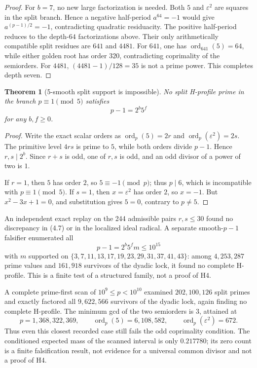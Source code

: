 \documentclass[11pt]{amsart}
\newtheorem{theorem}{Theorem}[section]
\theoremstyle{definition}
\theoremstyle{remark}
\newcommand{\eps}{\varepsilon}
\newcommand{\ord}{\operatorname{ord}}
\begin{document}
\begin{proof}
For \(b=7\), no new large factorization is needed.  Both \(5\) and
\(\eps^2\) are squares in the split branch.  Hence a negative
half-period \(a^{64}=-1\) would give
\(a^{(p-1)/2}=-1\), contradicting quadratic residuacity.  The positive
half-period reduces to the depth-\(64\) factorizations above.  Their
only arithmetically compatible split residues are \(641\) and \(4481\).
For \(641\), one has \(\ord_{641}(5)=64\), while either golden root has
order \(320\), contradicting coprimality of the semiorders.  For \(4481\),
\((4481-1)/128=35\) is not a prime power.  This completes depth seven.
\end{proof}

\begin{theorem}[5-smooth split support is impossible]
\label{thm:Hfivesmooth}
No split H-profile prime in the branch \(p\equiv1\pmod5\) satisfies
\[
p-1=2^b5^f
\]
for any \(b,f\ge0\).
\end{theorem}

\begin{proof}
Write the exact scalar orders as
\(\ord_p(5)=2r\) and \(\ord_p(\eps^2)=2s\).  The primitive level
\(4rs\) is prime to \(5\), while both orders divide \(p-1\).  Hence
\(r,s\mid2^b\).  Since \(r+s\) is odd, one of \(r,s\) is odd, and an
odd divisor of a power of two is \(1\).

If \(r=1\), then \(5\) has order \(2\), so \(5\equiv-1\pmod p\);
thus \(p\mid6\), which is incompatible with \(p\equiv1\pmod5\).
If \(s=1\), then \(x=\eps^2\) has order \(2\), so \(x=-1\).  But
\(x^2-3x+1=0\), and substitution gives \(5=0\), contrary to
\(p\ne5\).
\end{proof}

An independent exact replay on the 244 admissible pairs
\(r,s\le30\) found no discrepancy in (4.7) or in the localized ideal
radical. A separate smooth-\(p-1\) falsifier enumerated all
\[
p-1=2^b5^f m\le10^{15}
\]
with \(m\) supported on
\(\{3,7,11,13,17,19,23,29,31,37,41,43\}\):
among \(4{,}253{,}287\) prime values and \(161{,}918\) survivors of the
dyadic lock, it found no complete H-profile. This is a finite test of a
structured family, not a proof of H4.

A complete prime-first scan of \(10^9\le p<10^{10}\) examined
\(202{,}100{,}126\) split primes and exactly factored all
\(9{,}622{,}566\) survivors of the dyadic lock, again finding no
complete H-profile.  The minimum gcd of the two semiorders is \(3\),
attained at
\[
p=1{,}368{,}322{,}369,\qquad
\ord_p(5)=6{,}108{,}582,\qquad
\ord_p(\eps^2)=672.
\]
Thus even this closest recorded case still fails the odd coprimality
condition.  The conditioned expected mass of the scanned interval is
only \(0.217780\); its zero count is a finite falsification result, not
evidence for a universal common divisor and not a proof of H4.
\end{document}
